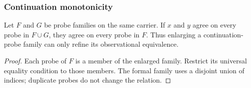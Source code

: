 \subsubsection{Continuation monotonicity}\label{ss:monotonicity}

\begin{theorem}\label{thm:family-growth}
Let $F$ and $G$ be probe families on the same carrier. If $x$ and
$y$ agree on every probe in $F\cup G$, they agree on every probe
in $F$. Thus enlarging a continuation-probe family can only refine
its observational equivalence.
\end{theorem}
\begin{proof}
Each probe of $F$ is a member of the enlarged family. Restrict its
universal equality condition to those members. The formal family uses
a disjoint union of indices; duplicate probes do not change the relation.
\end{proof}
